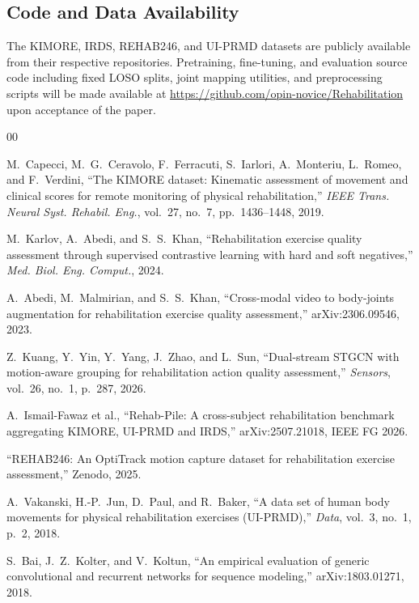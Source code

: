 \documentclass[10pt,journal]{IEEEtran}
\begin{document}
\subsection*{Code and Data Availability}
The KIMORE, IRDS, REHAB246, and UI-PRMD datasets are publicly available from their respective repositories. Pretraining, fine-tuning, and evaluation source code including fixed LOSO splits, joint mapping utilities, and preprocessing scripts will be made available at \url{https://github.com/opin-novice/Rehabilitation} upon acceptance of the paper.

\begin{thebibliography}{00}

M.~Capecci, M.~G.~Ceravolo, F.~Ferracuti, S.~Iarlori, A.~Monteriu, L.~Romeo, and F.~Verdini,
``The KIMORE dataset: Kinematic assessment of movement and clinical scores for remote monitoring of physical rehabilitation,''
\textit{IEEE Trans. Neural Syst. Rehabil. Eng.}, vol.~27, no.~7, pp.~1436--1448, 2019.

M.~Karlov, A.~Abedi, and S.~S.~Khan,
``Rehabilitation exercise quality assessment through supervised contrastive learning with hard and soft negatives,''
\textit{Med. Biol. Eng. Comput.}, 2024.

A.~Abedi, M.~Malmirian, and S.~S.~Khan,
``Cross-modal video to body-joints augmentation for rehabilitation exercise quality assessment,''
arXiv:2306.09546, 2023.

Z.~Kuang, Y.~Yin, Y.~Yang, J.~Zhao, and L.~Sun,
``Dual-stream STGCN with motion-aware grouping for rehabilitation action quality assessment,''
\textit{Sensors}, vol.~26, no.~1, p.~287, 2026.

A.~Ismail-Fawaz et al.,
``Rehab-Pile: A cross-subject rehabilitation benchmark aggregating KIMORE, UI-PRMD and IRDS,''
arXiv:2507.21018, IEEE FG 2026.

``REHAB246: An OptiTrack motion capture dataset for rehabilitation exercise assessment,''
Zenodo, 2025.

A.~Vakanski, H.-P.~Jun, D.~Paul, and R.~Baker,
``A data set of human body movements for physical rehabilitation exercises (UI-PRMD),''
\textit{Data}, vol.~3, no.~1, p.~2, 2018.

S.~Bai, J.~Z.~Kolter, and V.~Koltun,
``An empirical evaluation of generic convolutional and recurrent networks for sequence modeling,''
arXiv:1803.01271, 2018.


\end{thebibliography}
\end{document}
